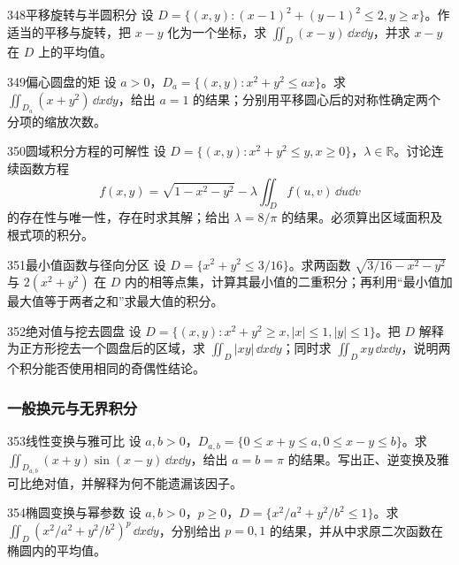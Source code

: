 \begin{exercise}{348}{平移旋转与半圆积分}
设 $D=\{(x,y):(x-1)^2+(y-1)^2\leq2,y\geq x\}$。作适当的平移与旋转，把 $x-y$ 化为一个坐标，求 $\iint_D(x-y)\,\dd x\dd y$，并求 $x-y$ 在 $D$ 上的平均值。
\end{exercise}

\begin{exercise}{349}{偏心圆盘的矩}
设 $a>0$，$D_a=\{(x,y):x^2+y^2\leq ax\}$。求 $\iint_{D_a}(x+y^2)\,\dd x\dd y$，给出 $a=1$ 的结果；分别用平移圆心后的对称性确定两个分项的缩放次数。
\end{exercise}

\begin{exercise}{350}{圆域积分方程的可解性}
设 $D=\{(x,y):x^2+y^2\leq y,x\geq0\}$，$\lambda\in\mathbb R$。讨论连续函数方程
\[
 f(x,y)=\sqrt{1-x^2-y^2}-\lambda\iint_Df(u,v)\,\dd u\dd v
\]
的存在性与唯一性，存在时求其解；给出 $\lambda=8/\pi$ 的结果。必须算出区域面积及根式项的积分。
\end{exercise}

\begin{exercise}{351}{最小值函数与径向分区}
设 $D=\{x^2+y^2\leq3/16\}$。求两函数 $\sqrt{3/16-x^2-y^2}$ 与 $2(x^2+y^2)$ 在 $D$ 内的相等点集，计算其最小值的二重积分；再利用“最小值加最大值等于两者之和”求最大值的积分。
\end{exercise}

\begin{exercise}{352}{绝对值与挖去圆盘}
设 $D=\{(x,y):x^2+y^2\geq x,|x|\leq1,|y|\leq1\}$。把 $D$ 解释为正方形挖去一个圆盘后的区域，求 $\iint_D|xy|\,\dd x\dd y$；同时求 $\iint_Dxy\,\dd x\dd y$，说明两个积分能否使用相同的奇偶性结论。
\end{exercise}

\subsubsection{一般换元与无界积分}

\begin{exercise}{353}{线性变换与雅可比}
设 $a,b>0$，$D_{a,b}=\{0\leq x+y\leq a,0\leq x-y\leq b\}$。求
$\iint_{D_{a,b}}(x+y)\sin(x-y)\,\dd x\dd y$，给出 $a=b=\pi$ 的结果。写出正、逆变换及雅可比绝对值，并解释为何不能遗漏该因子。
\end{exercise}

\begin{exercise}{354}{椭圆变换与幂参数}
设 $a,b>0$，$p\geq0$，$D=\{x^2/a^2+y^2/b^2\leq1\}$。求
$\iint_D(x^2/a^2+y^2/b^2)^p\,\dd x\dd y$，分别给出 $p=0,1$ 的结果，并从中求原二次函数在椭圆内的平均值。
\end{exercise}

